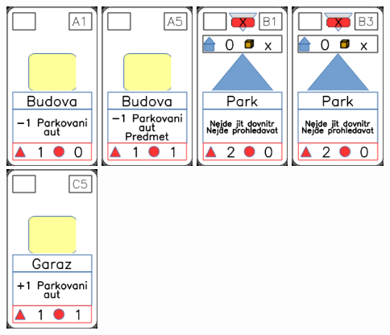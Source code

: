 \documentclass[a4paper]{article}
\begin{document}
	\includegraphics[width=3.0cm]{img-2_0}
	\includegraphics[width=3.0cm]{img-2_4}
	\includegraphics[width=3.0cm]{img-3_20}
	\includegraphics[width=3.0cm]{img-3_22}
	\includegraphics[width=3.0cm]{img-2_14}
\end{document}
